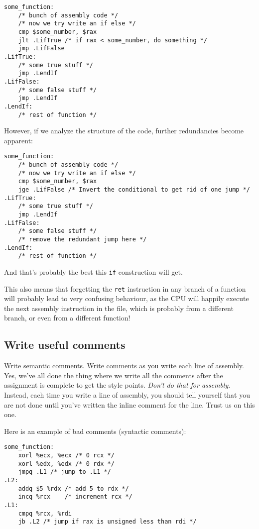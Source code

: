 \documentclass[11pt]{article}
\begin{document}
\begin{lstlisting}[caption={Correct control flow}, captionpos=b]
some_function:
    /* bunch of assembly code */
    /* now we try write an if else */
    cmp $some_number, $rax
    jlt .LifTrue /* if rax < some_number, do something */
    jmp .LifFalse
.LifTrue:
    /* some true stuff */
    jmp .LendIf
.LifFalse:
    /* some false stuff */
    jmp .LendIf
.LendIf:
    /* rest of function */
\end{lstlisting}

However, if we analyze the structure of the code, further redundancies become apparent:

\begin{lstlisting}[caption={Optimized if-else equivalent}, captionpos=b]
some_function:
    /* bunch of assembly code */
    /* now we try write an if else */
    cmp $some_number, $rax
    jge .LifFalse /* Invert the conditional to get rid of one jump */
.LifTrue:
    /* some true stuff */
    jmp .LendIf
.LifFalse:
    /* some false stuff */
    /* remove the redundant jump here */
.LendIf:
    /* rest of function */
\end{lstlisting}

And that's probably the best this \texttt{if} construction will get.

This also means that forgetting the \texttt{ret} instruction in any branch of a function
will probably lead to very confusing behaviour, as the CPU will happily execute the next
assembly instruction in the file, which is probably from a different branch, or even from
a different function!

\subsection{Write useful comments}

Write semantic comments. Write comments as you write each line of assembly. Yes, we've all
done the thing where we write all the comments after the assignment is complete to get the
style points. \emph{Don't do that for assembly}. Instead, each time you write a line of assembly,
you should tell yourself that you are not done until you've written the inline comment for
the line. Trust us on this one.

Here is an example of bad comments (syntactic comments):

\begin{lstlisting}[caption={Bad: \emph{syntactic} comments}, captionpos=b]
some_function:
    xorl %ecx, %ecx /* 0 rcx */
    xorl %edx, %edx /* 0 rdx */
    jmpq .L1 /* jump to .L1 */
.L2:
    addq $5 %rdx /* add 5 to rdx */
    incq %rcx    /* increment rcx */
.L1:
    cmpq %rcx, %rdi
    jb .L2 /* jump if rax is unsigned less than rdi */
\end{lstlisting}
\end{document}
